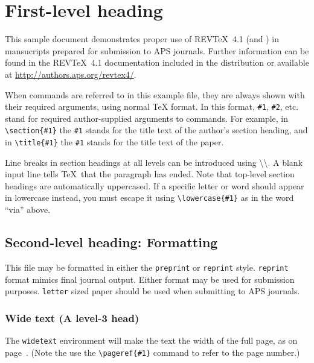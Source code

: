 
\section{\label{sec:level1}First-level heading}

This sample document demonstrates proper use of REV\TeX~4.1 (and
\LaTeXe) in mansucripts prepared for submission to APS
journals. Further information can be found in the REV\TeX~4.1
documentation included in the distribution or available at
\url{http://authors.aps.org/revtex4/}.

When commands are referred to in this example file, they are always
shown with their required arguments, using normal \TeX{} format. In
this format, \verb+#1+, \verb+#2+, etc. stand for required
author-supplied arguments to commands. For example, in
\verb+\section{#1}+ the \verb+#1+ stands for the title text of the
author's section heading, and in \verb+\title{#1}+ the \verb+#1+
stands for the title text of the paper.

Line breaks in section headings at all levels can be introduced using
\textbackslash\textbackslash. A blank input line tells \TeX\ that the
paragraph has ended. Note that top-level section headings are
automatically uppercased. If a specific letter or word should appear in
lowercase instead, you must escape it using \verb+\lowercase{#1}+ as
in the word ``via'' above.

\subsection{\label{sec:level2}Second-level heading: Formatting}

This file may be formatted in either the \texttt{preprint} or
\texttt{reprint} style. \texttt{reprint} format mimics final journal output. 
Either format may be used for submission purposes. \texttt{letter} sized paper should
be used when submitting to APS journals.

\subsubsection{Wide text (A level-3 head)}
The \texttt{widetext} environment will make the text the width of the
full page, as on page~\pageref{eq:wideeq}. (Note the use the
\verb+\pageref{#1}+ command to refer to the page number.) 
